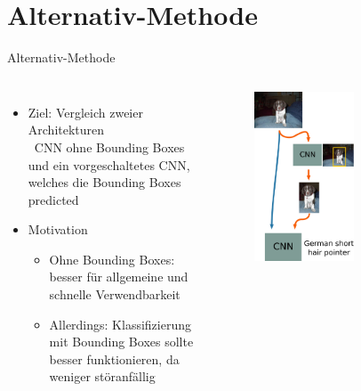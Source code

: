   \section{Alternativ-Methode}
  \begin{frame}{Alternativ-Methode}
    \begin{columns}[c]
      \begin{itemize}
        \item Ziel: Vergleich zweier Architekturen \\
        \rightarrow \ CNN ohne Bounding Boxes und ein vorgeschaltetes CNN, welches
        die Bounding Boxes predicted
        \item Motivation
        \begin{itemize}
          \item Ohne Bounding Boxes: besser für allgemeine und schnelle
          Verwendbarkeit
          \item Allerdings: Klassifizierung mit Bounding Boxes sollte besser funktionieren,
          da weniger störanfällig
        \end{itemize}
      \end{itemize}
      \begin{figure}
        \centering
        \includegraphics[width=0.6\textwidth]{logos/alternative_method.pdf}
      \end{figure}
    \end{columns}
  \end{frame}


